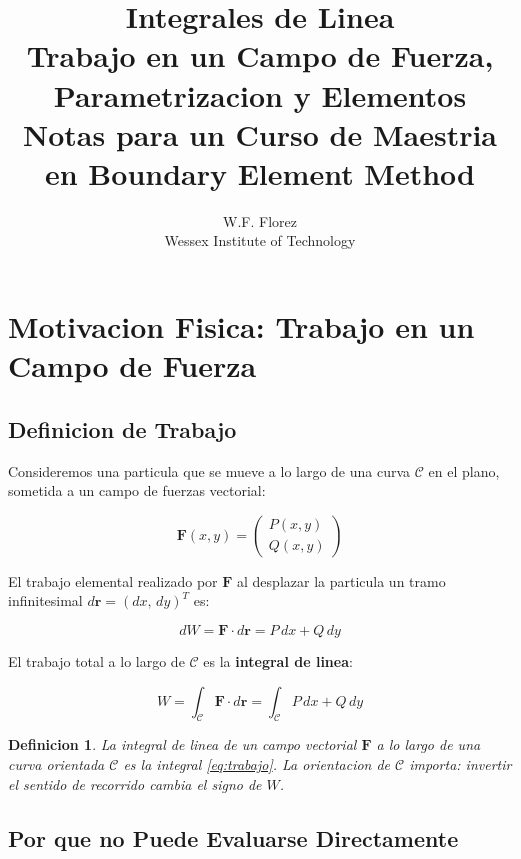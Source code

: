 \documentclass[12pt,a4paper]{article}
\title{\textbf{Integrales de Linea}\\[0.5em]
\large Trabajo en un Campo de Fuerza, Parametrizacion y Elementos\\[0.3em]
\normalsize Notas para un Curso de Maestria en Boundary Element Method}
\author{W.F. Florez\\
\small Wessex Institute of Technology}
\date{}
\newtheorem{definition}{Definicion}
\begin{document}
\maketitle
\tableofcontents
\newpage

\section{Motivacion Fisica: Trabajo en un Campo de Fuerza}

\subsection{Definicion de Trabajo}

Consideremos una particula que se mueve a lo largo de una curva $\mathcal{C}$
en el plano, sometida a un campo de fuerzas vectorial:

\begin{equation}
    \mathbf{F}(x,y) = \begin{pmatrix} P(x,y) \\ Q(x,y) \end{pmatrix}
\end{equation}

El trabajo elemental realizado por $\mathbf{F}$ al desplazar la particula
un tramo infinitesimal $d\mathbf{r} = (dx,\, dy)^T$ es:

\begin{equation}
    dW = \mathbf{F} \cdot d\mathbf{r} = P\,dx + Q\,dy
\end{equation}

El trabajo total a lo largo de $\mathcal{C}$ es la \textbf{integral de linea}:

\begin{equation}
\boxed{
    W = \int_\mathcal{C} \mathbf{F} \cdot d\mathbf{r}
      = \int_\mathcal{C} P\,dx + Q\,dy
}
\label{eq:trabajo}
\end{equation}

\begin{definition}
La integral de linea de un campo vectorial $\mathbf{F}$ a lo largo de
una curva orientada $\mathcal{C}$ es la integral \eqref{eq:trabajo}.
La orientacion de $\mathcal{C}$ importa: invertir el sentido de recorrido
cambia el signo de $W$.
\end{definition}

\subsection{Por que no Puede Evaluarse Directamente}
\end{document}
